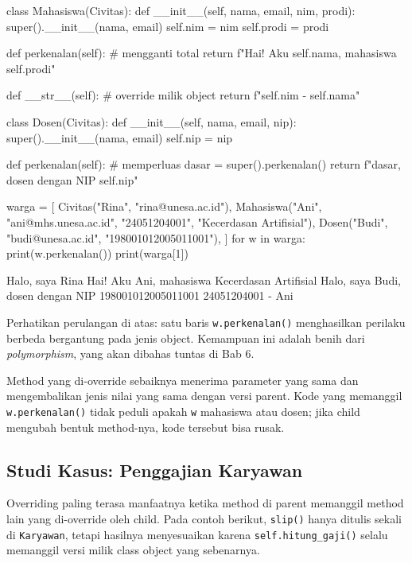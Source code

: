 \begin{kode}
class Mahasiswa(Civitas):
    def __init__(self, nama, email, nim, prodi):
        super().__init__(nama, email)
        self.nim = nim
        self.prodi = prodi

    def perkenalan(self):                          # mengganti total
        return f"Hai! Aku {self.nama}, mahasiswa {self.prodi}"

    def __str__(self):                             # override milik object
        return f"{self.nim} - {self.nama}"

class Dosen(Civitas):
    def __init__(self, nama, email, nip):
        super().__init__(nama, email)
        self.nip = nip

    def perkenalan(self):                          # memperluas
        dasar = super().perkenalan()
        return f"{dasar}, dosen dengan NIP {self.nip}"

warga = [
    Civitas("Rina", "rina@unesa.ac.id"),
    Mahasiswa("Ani", "ani@mhs.unesa.ac.id", "24051204001", "Kecerdasan Artifisial"),
    Dosen("Budi", "budi@unesa.ac.id", "198001012005011001"),
]
for w in warga:
    print(w.perkenalan())
print(warga[1])
\end{kode}

\begin{keluaran}
Halo, saya Rina
Hai! Aku Ani, mahasiswa Kecerdasan Artifisial
Halo, saya Budi, dosen dengan NIP 198001012005011001
24051204001 - Ani
\end{keluaran}

Perhatikan perulangan di atas: satu baris \texttt{w.perkenalan()} menghasilkan perilaku berbeda bergantung pada jenis object. Kemampuan ini adalah benih dari \emph{polymorphism}, yang akan dibahas tuntas di Bab 6.

\begin{penting}
Method yang di-override sebaiknya menerima parameter yang sama dan mengembalikan jenis nilai yang sama dengan versi parent. Kode yang memanggil \texttt{w.perkenalan()} tidak peduli apakah \texttt{w} mahasiswa atau dosen; jika child mengubah bentuk method-nya, kode tersebut bisa rusak.
\end{penting}

\subsection{Studi Kasus: Penggajian Karyawan}

Overriding paling terasa manfaatnya ketika method di parent memanggil method lain yang di-override oleh child. Pada contoh berikut, \texttt{slip()} hanya ditulis sekali di \texttt{Karyawan}, tetapi hasilnya menyesuaikan karena \texttt{self.hitung\_gaji()} selalu memanggil versi milik class object yang sebenarnya.

